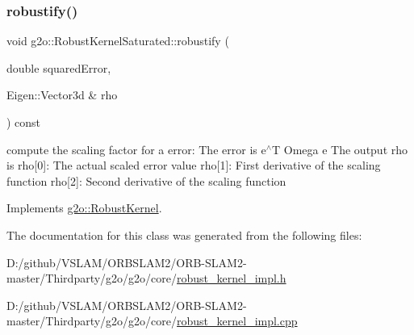 \subsubsection{\texorpdfstring{robustify()}{robustify()}}
{\footnotesize\ttfamily void g2o\+::\+Robust\+Kernel\+Saturated\+::robustify (\begin{DoxyParamCaption}\item[{double}]{squared\+Error,  }\item[{Eigen\+::\+Vector3d \&}]{rho }\end{DoxyParamCaption}) const\hspace{0.3cm}{\ttfamily [virtual]}}

compute the scaling factor for a error\+: The error is e$^\wedge$T Omega e The output rho is rho\mbox{[}0\mbox{]}\+: The actual scaled error value rho\mbox{[}1\mbox{]}\+: First derivative of the scaling function rho\mbox{[}2\mbox{]}\+: Second derivative of the scaling function 

Implements \mbox{\hyperlink{classg2o_1_1_robust_kernel_ab47b071a0cfe466be063f0104bc41d0f}{g2o\+::\+Robust\+Kernel}}.



The documentation for this class was generated from the following files\+:\begin{DoxyCompactItemize}
\item 
D\+:/github/\+V\+S\+L\+A\+M/\+O\+R\+B\+S\+L\+A\+M2/\+O\+R\+B-\/\+S\+L\+A\+M2-\/master/\+Thirdparty/g2o/g2o/core/\mbox{\hyperlink{robust__kernel__impl_8h}{robust\+\_\+kernel\+\_\+impl.\+h}}\item 
D\+:/github/\+V\+S\+L\+A\+M/\+O\+R\+B\+S\+L\+A\+M2/\+O\+R\+B-\/\+S\+L\+A\+M2-\/master/\+Thirdparty/g2o/g2o/core/\mbox{\hyperlink{robust__kernel__impl_8cpp}{robust\+\_\+kernel\+\_\+impl.\+cpp}}\end{DoxyCompactItemize}
